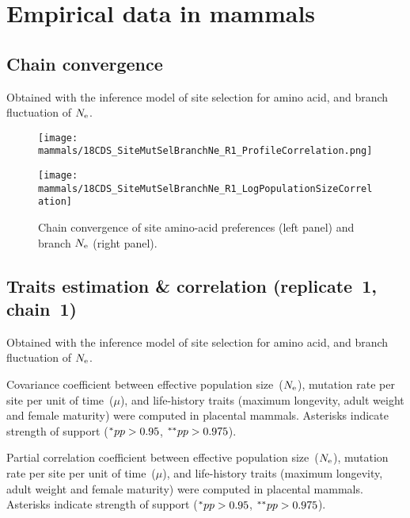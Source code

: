 \section{Empirical data in mammals}
\label{sec:empirical-data-in-mammals}

\subsection{Chain convergence}
\label{subsec:chain-convergence}
Obtained with the inference model of site selection for amino acid, and branch fluctuation of $\Ne$.

\begin{figure}[H]
    \centering
    \begin{minipage}{0.49\linewidth}
        \texttt{[image: mammals/18CDS\_SiteMutSelBranchNe\_R1\_ProfileCorrelation.png]}
    \end{minipage} \hfill
    \begin{minipage}{0.49\linewidth}
        \texttt{[image: mammals/18CDS\_SiteMutSelBranchNe\_R1\_LogPopulationSizeCorrelation]}
    \end{minipage}
    \caption[Chain convergence of site profiles and branche $\Ne$]{
    Chain convergence of site amino-acid preferences (left panel) and branch $\Ne$ (right panel).}
\end{figure}

\subsection{Traits estimation \& correlation (replicate~1, chain~1)}
Obtained with the inference model of site selection for amino acid, and branch fluctuation of $\Ne$.

\begin{table}[H]
    
    \caption[Covariance matrix in mammals]{
    Covariance coefficient between effective population size~($\Ne$), mutation rate per site per unit of time~($\mu$), and life-history traits (maximum longevity, adult weight and female maturity) were computed in placental mammals.
    Asterisks indicate strength of support ($\smash{^{*}} pp > 0.95$, $\smash{^{**}} pp > 0.975$).}
\end{table}

\begin{table}[H]
    
    \caption[Partial correlation coefficient matrix in mammals]{
    Partial correlation coefficient between effective population size~($\Ne$), mutation rate per site per unit of time~($\mu$), and life-history traits (maximum longevity, adult weight and female maturity) were computed in placental mammals.
    Asterisks indicate strength of support ($\smash{^{*}} pp > 0.95$, $\smash{^{**}} pp > 0.975$).}
    \label{tab:table-partcor-mammals}
\end{table}

